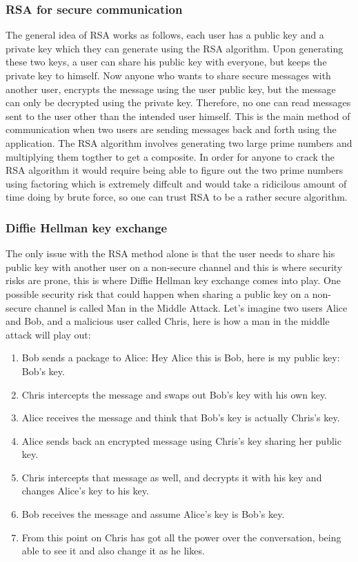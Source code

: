 \documentclass[twoside]{article}
\begin{document}
\begin{multicols}{2}
\subsubsection{RSA for secure communication}
The general idea of RSA works as follows, each user has a public key and a private key which they can generate using the RSA algorithm. Upon generating these two keys, a user can share his public key with 
everyone, but keeps 
the private key to himself. Now anyone who wants to share secure messages with another user, encrypts the message using the user public key, but the message can only be decrypted using the private key. Therefore, no 
one can read messages sent to the user other than the intended user himself. This is the main method of communication when two users are sending messages back and forth using the application. The RSA algorithm involves generating two large prime numbers and multiplying them togther to get a composite. In order for anyone to 
crack the RSA algorithm it would require being able to figure out the two prime numbers using factoring which is extremely diffcult and would take a ridicilous amount of time doing by brute force, so one can 
trust RSA to be a rather secure algorithm.
\subsubsection{Diffie Hellman key exchange}
The only issue with the RSA method alone is that the user needs to share his public key with another user on a non-secure channel and this 
is where security risks are prone, this is where Diffie Hellman key exchange comes into play. One possible security risk that could happen when sharing a public key on a non-secure channel is called Man in the Middle Attack. Let's imagine two users Alice and Bob, and a malicious user called Chris, here is how a man in the middle attack will play out:

\begin{enumerate}
  \item Bob sends a package to Alice: Hey Alice this is Bob, here is my public key: Bob's key.
  \item Chris intercepts the message and swaps out Bob's key with his own key.
  \item Alice receives the message and think that Bob's key is actually Chris's key.
  \item Alice sends back an encrypted message using Chris's key sharing her public key. 
  \item Chris intercepts that message as well, and decrypts it with his key and changes Alice's key to his key.
  \item Bob receives the message and assume Alice's key is Bob's key.
  \item From this point on Chris has got all the power over the conversation, being able to see it and also change it as he likes. 
\end{enumerate}


\end{multicols}
\end{document}
